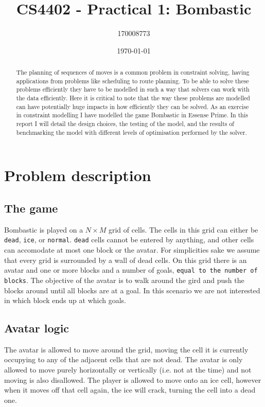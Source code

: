\documentclass[british]{article}
\title{CS4402 - Practical 1: Bombastic}
\author{170008773}
\date{\today}
\newcommand{\code}[1]{\texttt{#1}}
\begin{document}
\maketitle


\begin{abstract}
 The planning of sequences of moves is a common problem in constraint solving, having applications from problems like scheduling to route planning. To be able to solve these problems efficiently they have to be modelled in such a way that solvers can work with the data efficiently. Here it is critical to note that the way these problems are modelled can have potentially huge impacts in how efficiently they can be solved. As an exercise in constraint modelling I have modelled the game Bombastic in Essense Prime. In this report I will detail the design choices, the testing of the model, and the results of benchmarking the model with different levels of optimisation performed by the solver. 
\end{abstract}

\section{Problem description}
\label{problem}
\subsection{The game}
Bombastic is played on a $N\times M$ grid of cells. The cells in this grid can either be \code{dead}, \code{ice}, or \code{normal}. \code{dead} cells cannot be entered by anything, and other cells can accomodate at most one block or the avatar. For simplicities sake we assume that every grid is surrounded by a wall of dead cells. On this grid there is an avatar and one or more blocks and a number of goals, \texttt{equal to the number of blocks}. The objective of the avatar is to walk around the gird and push the blocks around until all blocks are at a goal. In this scenario we are not interested in which block ends up at which goals.  


\subsection{Avatar logic}
The avatar is allowed to move around the grid, moving the cell it is currently occupying to any of the adjacent cells that are not dead. The avatar is only allowed to move purely horizontally or vertically (i.e. not at the time) and not moving is also disallowed.  The player is allowed to move onto an ice cell, however when it moves off that cell again, the ice will crack, turning the cell into a dead one. 
\end{document}

